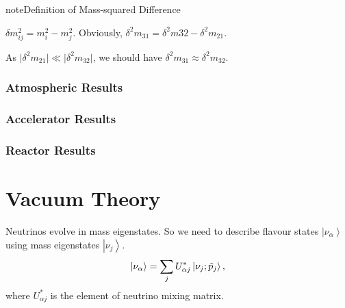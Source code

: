 \documentclass[letterpaper,12pt,english]{sphinxmanual}
\newcommand{\ket}[1]{\left| #1\right\rangle}
\begin{document}
\begin{notice}{note}{Definition of Mass-squared Difference}

\(\delta m^2 _{ij}=m_i^2-m_j^2\). Obviously, \(\delta^2 m_{31}=\delta^2 m{32}-\delta^2 m_{21}\).
\end{notice}

As \(\lvert \delta^2 m_{21}\rvert\ll \lvert\delta^2 m_{32}\rvert\), we should have \(\delta^2 m_{31} \approx \delta^2 m_{32}\).


\subsubsection{Atmospheric Results}
\label{oscillations:atmospheric-results}

\subsubsection{Accelerator Results}
\label{oscillations:accelerator-results}

\subsubsection{Reactor Results}
\label{oscillations:reactor-results}

\section{Vacuum Theory}
\label{oscillations:vacuum-theory}
Neutrinos evolve in mass eigenstates. So we need to describe flavour states \(\ket{\nu_\alpha}\) using mass eigenstates \(\ket{\nu_j}\).
\begin{gather}
\begin{split}\ket{\nu_\alpha} = \sum_j U^*_{\alpha j} \ket{\nu_j;\tilde p_j},\end{split}\notag
\end{gather}
where \(U^*_{\alpha j}\) is the element of neutrino mixing matrix.
\end{document}
